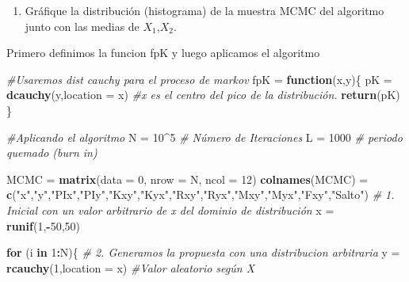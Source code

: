 \documentclass[
]{article}
\newenvironment{Shaded}{\begin{snugshade}}{\end{snugshade}}
\newcommand{\AttributeTok}[1]{\textcolor[rgb]{0.13,0.29,0.53}{#1}}
\newcommand{\CommentTok}[1]{\textcolor[rgb]{0.56,0.35,0.01}{\textit{#1}}}
\newcommand{\ControlFlowTok}[1]{\textcolor[rgb]{0.13,0.29,0.53}{\textbf{#1}}}
\newcommand{\DecValTok}[1]{\textcolor[rgb]{0.00,0.00,0.81}{#1}}
\newcommand{\FunctionTok}[1]{\textcolor[rgb]{0.13,0.29,0.53}{\textbf{#1}}}
\newcommand{\NormalTok}[1]{#1}
\newcommand{\OtherTok}[1]{\textcolor[rgb]{0.56,0.35,0.01}{#1}}
\newcommand{\SpecialCharTok}[1]{\textcolor[rgb]{0.81,0.36,0.00}{\textbf{#1}}}
\newcommand{\StringTok}[1]{\textcolor[rgb]{0.31,0.60,0.02}{#1}}
\providecommand{\tightlist}{%
  \setlength{\itemsep}{0pt}\setlength{\parskip}{0pt}}
\begin{document}
\begin{enumerate}
\def\labelenumi{\alph{enumi}.}
\setcounter{enumi}{1}
\tightlist
\item
  Gráfique la distribución (histograma) de la muestra MCMC del algoritmo
  junto con las medias de \(𝑋_1\),\(𝑋_2\).
\end{enumerate}

Primero definimos la funcion fpK y luego aplicamos el algoritmo

\begin{Shaded}
\begin{Highlighting}[]
\CommentTok{\#Usaremos dist cauchy para el proceso de markov}
\NormalTok{fpK }\OtherTok{=} \ControlFlowTok{function}\NormalTok{(x,y)\{}
\NormalTok{  pK }\OtherTok{=} \FunctionTok{dcauchy}\NormalTok{(y,}\AttributeTok{location =}\NormalTok{ x) }\CommentTok{\#x es el centro del pico de la distribución.}
  \FunctionTok{return}\NormalTok{(pK)}
\NormalTok{\}}

\CommentTok{\#Aplicando el algoritmo}
\NormalTok{N }\OtherTok{=} \DecValTok{10}\SpecialCharTok{\^{}}\DecValTok{5} \CommentTok{\# Número de Iteraciones}
\NormalTok{L }\OtherTok{=} \DecValTok{1000} \CommentTok{\# periodo quemado (burn in)}

\NormalTok{MCMC }\OtherTok{=} \FunctionTok{matrix}\NormalTok{(}\AttributeTok{data =} \DecValTok{0}\NormalTok{, }\AttributeTok{nrow =}\NormalTok{ N, }\AttributeTok{ncol =} \DecValTok{12}\NormalTok{)}
\FunctionTok{colnames}\NormalTok{(MCMC) }\OtherTok{=}
  \FunctionTok{c}\NormalTok{(}\StringTok{"x"}\NormalTok{,}\StringTok{"y"}\NormalTok{,}\StringTok{"PIx"}\NormalTok{,}\StringTok{"PIy"}\NormalTok{,}\StringTok{"Kxy"}\NormalTok{,}\StringTok{"Kyx"}\NormalTok{,}\StringTok{"Rxy"}\NormalTok{,}\StringTok{"Ryx"}\NormalTok{,}\StringTok{"Mxy"}\NormalTok{,}\StringTok{"Myx"}\NormalTok{,}\StringTok{"Fxy"}\NormalTok{,}\StringTok{"Salto"}\NormalTok{)}
\CommentTok{\# 1. Inicial con un valor arbitrario de x del dominio de distribución}
\NormalTok{x }\OtherTok{=} \FunctionTok{runif}\NormalTok{(}\DecValTok{1}\NormalTok{,}\SpecialCharTok{{-}}\DecValTok{50}\NormalTok{,}\DecValTok{50}\NormalTok{)}

\ControlFlowTok{for}\NormalTok{ (i }\ControlFlowTok{in} \DecValTok{1}\SpecialCharTok{:}\NormalTok{N)\{}
  \CommentTok{\# 2. Generamos la propuesta con una distribucion arbitraria}
\NormalTok{  y }\OtherTok{=} \FunctionTok{rcauchy}\NormalTok{(}\DecValTok{1}\NormalTok{,}\AttributeTok{location =}\NormalTok{ x) }\CommentTok{\#Valor aleatorio según X}
  

\end{Highlighting}
\end{Shaded}
\end{document}
